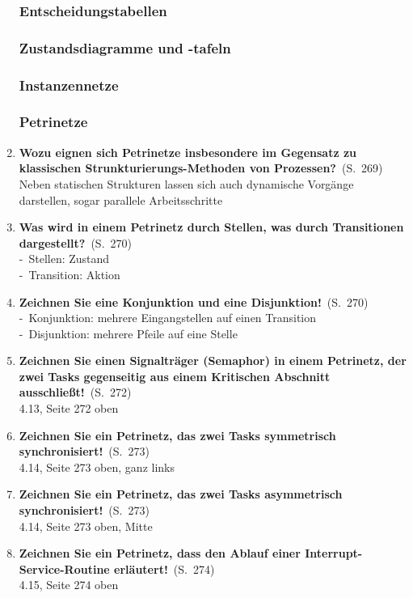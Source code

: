 \documentclass[a4paper,12pt]{article}
\newcommand{\question}[3]{\pagebreak[3]\item {\textbf{#1?}}\ (S.\ #2)#3}
\newcommand{\statement}[3]{\pagebreak[3]\item {\textbf{#1!}}\ (S.\ #2)#3}
\newcommand{\catchword}[1]{\\-\ #1}
\newcommand{\normaltext}[1]{\\#1}
\newcommand{\page}[1]{#1}
\begin{document}
\begin{enumerate}
  \subsubsection{Entscheidungstabellen}

  \subsubsection{Zustandsdiagramme und -tafeln}

  \subsubsection{Instanzennetze}

  \subsubsection{Petrinetze}

  \question{Wozu eignen sich Petrinetze insbesondere im Gegensatz zu 
            klassischen Strunkturierungs-Methoden von Prozessen}{\page{269}}
  {
    \normaltext{Neben statischen Strukturen lassen sich auch dynamische
                Vorgänge darstellen, sogar parallele Arbeitsschritte}
  }

  \question{Was wird in einem Petrinetz durch Stellen, was durch Transitionen
            dargestellt}{\page{270}}
  {
    \catchword{Stellen: Zustand}
    \catchword{Transition: Aktion}
  }

  \statement{Zeichnen Sie eine Konjunktion und eine Disjunktion}{\page{270}}
  {
    \catchword{Konjunktion: mehrere Eingangstellen auf einen Transition}
    \catchword{Disjunktion: mehrere Pfeile auf eine Stelle}
  }

  \statement{Zeichnen Sie einen Signalträger (Semaphor) in einem Petrinetz,
             der zwei Tasks gegenseitig aus einem Kritischen Abschnitt ausschließt}{\page{272}}
  {
    \normaltext{ 4.13, Seite 272 oben}
  }

  \statement{Zeichnen Sie ein Petrinetz, das zwei Tasks symmetrisch 
             synchronisiert}{\page{273}}
  {
    \normaltext{ 4.14, Seite 273 oben, ganz links}
  }

  \statement{Zeichnen Sie ein Petrinetz, das zwei Tasks asymmetrisch 
             synchronisiert}{\page{273}}
  {
    \normaltext{ 4.14, Seite 273 oben, Mitte}
  }

  \statement{Zeichnen Sie ein Petrinetz, dass den Ablauf einer
             Interrupt-Service-Routine erläutert}{\page{274}}
  {
    \normaltext{\index{Bild} 4.15, Seite 274 oben}
  }


\end{enumerate}
\end{document}
